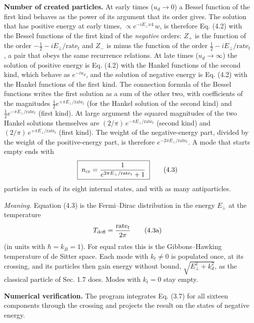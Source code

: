 \documentclass[
  10pt,
]{article}
\begin{document}
\textbf{Number of created particles.} At early times (\(u_d\to0\)) a
Bessel function of the first kind behaves as the power of its argument
that its order gives. The solution that has positive energy at early
times, \(\propto e^{-iE_\perp x4}\,w\), is therefore Eq. (4.2) with the
Bessel functions of the first kind of the \emph{negative} orders:
\(Z_+\) is the function of the order
\(-\tfrac12-iE_\perp/\mathrm{rate}_t\) and \(Z_-\) is minus the function
of the order \(\tfrac12-iE_\perp/\mathrm{rate}_t\), a pair that obeys
the same recurrence relations. At late times (\(u_d\to\infty\)) the
solution of positive energy is Eq. (4.2) with the Hankel functions of
the second kind, which behave as \(e^{-iu_d}\), and the solution of
negative energy is Eq. (4.2) with the Hankel functions of the first
kind. The connection formula of the Bessel functions writes the first
solution as a sum of the other two, with coefficients of the magnitudes
\(\tfrac12e^{+\pi E_\perp/\mathrm{rate}_t}\) (for the Hankel solution of
the second kind) and \(\tfrac12e^{-\pi E_\perp/\mathrm{rate}_t}\) (first
kind). At large argument the squared magnitudes of the two Hankel
solutions themselves are \((2/\pi)\,e^{-\pi E_\perp/\mathrm{rate}_t}\)
(second kind) and \((2/\pi)\,e^{+\pi E_\perp/\mathrm{rate}_t}\) (first
kind). The weight of the negative-energy part, divided by the weight of
the positive-energy part, is therefore
\(e^{-2\pi E_\perp/\mathrm{rate}_t}\). A mode that starts empty ends
with
\[\boxed{\;n_{\rm cr}=\frac{1}{e^{2\pi E_\perp/\mathrm{rate}_t}+1}\;}\tag{4.3}\]
particles in each of its eight internal states, and with as many
antiparticles.

\emph{Meaning.} Equation (4.3) is the Fermi--Dirac distribution in the
energy \(E_\perp\) at the temperature
\[T_{\rm defl}=\frac{\mathrm{rate}_t}{2\pi}\tag{4.3a}\] (in units with
\(\hbar=k_B=1\)). For equal rates this is the Gibbons--Hawking
temperature of de Sitter space. Each mode with \(k_t\neq0\) is populated
once, at its crossing, and its particles then gain energy without bound,
\(\sqrt{E_\perp^2+k_d^2}\), as the classical particle of Sec. 1.7 does.
Modes with \(k_t=0\) stay empty.

\textbf{Numerical verification.} The program integrates Eq. (3.7) for
all sixteen components through the crossing and projects the result on
the states of negative energy.
\end{document}
